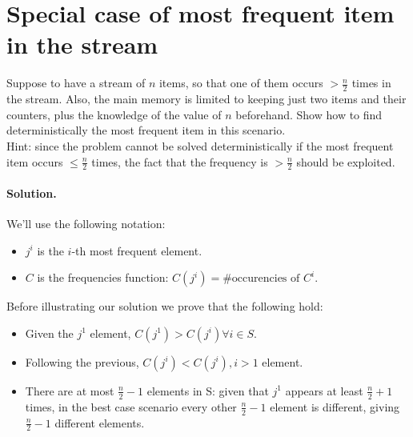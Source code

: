 \section{Special case of most frequent item in the stream}

Suppose to have a stream of $n$ items, so that one of them occurs $> \frac{n}{2}$
times in the stream.
Also, the main memory is limited to keeping just two items and their counters, plus
the knowledge of the value of $n$ beforehand.
Show how to find deterministically the most frequent item in this scenario.
\\ Hint: since the problem cannot be solved deterministically if the most
frequent item occurs $\leq \frac{n}{2}$ times, the fact that the frequency is
$> \frac{n}{2}$ should be exploited.

\vspace{0.5cm}
\paragraph{Solution.}
We'll use the following notation:
\begin{itemize}
  \item $j^i$ is the $i$-th most frequent element.
  \item $C$ is the frequencies function: $C(j^i) = \#\text{occurencies of } C^i$. 
\end{itemize}
Before illustrating our solution we prove that the following hold:
    \begin{itemize}
    \label{frequence_dominance}\item Given the $j^{1}$ element, $C(j^{1}) > C(j^{i}) \forall i \in S$.
    \item Following the previous, $C(j^{i}) < C(j^{i}),  i > 1$ element.
    \item There are at most $\frac{n}{2} - 1$ elements in S: given that $j^{1}$ appears at least $\frac{n}{2} + 1$ times, in the best case scenario every other $\frac{n}{2} - 1$ element is different, giving $\frac{n}{2} - 1$ different elements.
    \end{itemize}

